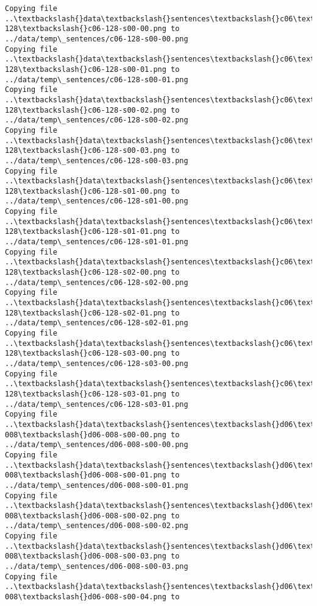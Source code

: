 \documentclass[11pt]{article}
\begin{document}
\begin{Verbatim}[commandchars=\\\{\}]
Copying file ..\textbackslash{}data\textbackslash{}sentences\textbackslash{}c06\textbackslash{}c06-128\textbackslash{}c06-128-s00-00.png to
../data/temp\_sentences/c06-128-s00-00.png
Copying file ..\textbackslash{}data\textbackslash{}sentences\textbackslash{}c06\textbackslash{}c06-128\textbackslash{}c06-128-s00-01.png to
../data/temp\_sentences/c06-128-s00-01.png
Copying file ..\textbackslash{}data\textbackslash{}sentences\textbackslash{}c06\textbackslash{}c06-128\textbackslash{}c06-128-s00-02.png to
../data/temp\_sentences/c06-128-s00-02.png
Copying file ..\textbackslash{}data\textbackslash{}sentences\textbackslash{}c06\textbackslash{}c06-128\textbackslash{}c06-128-s00-03.png to
../data/temp\_sentences/c06-128-s00-03.png
Copying file ..\textbackslash{}data\textbackslash{}sentences\textbackslash{}c06\textbackslash{}c06-128\textbackslash{}c06-128-s01-00.png to
../data/temp\_sentences/c06-128-s01-00.png
Copying file ..\textbackslash{}data\textbackslash{}sentences\textbackslash{}c06\textbackslash{}c06-128\textbackslash{}c06-128-s01-01.png to
../data/temp\_sentences/c06-128-s01-01.png
Copying file ..\textbackslash{}data\textbackslash{}sentences\textbackslash{}c06\textbackslash{}c06-128\textbackslash{}c06-128-s02-00.png to
../data/temp\_sentences/c06-128-s02-00.png
Copying file ..\textbackslash{}data\textbackslash{}sentences\textbackslash{}c06\textbackslash{}c06-128\textbackslash{}c06-128-s02-01.png to
../data/temp\_sentences/c06-128-s02-01.png
Copying file ..\textbackslash{}data\textbackslash{}sentences\textbackslash{}c06\textbackslash{}c06-128\textbackslash{}c06-128-s03-00.png to
../data/temp\_sentences/c06-128-s03-00.png
Copying file ..\textbackslash{}data\textbackslash{}sentences\textbackslash{}c06\textbackslash{}c06-128\textbackslash{}c06-128-s03-01.png to
../data/temp\_sentences/c06-128-s03-01.png
Copying file ..\textbackslash{}data\textbackslash{}sentences\textbackslash{}d06\textbackslash{}d06-008\textbackslash{}d06-008-s00-00.png to
../data/temp\_sentences/d06-008-s00-00.png
Copying file ..\textbackslash{}data\textbackslash{}sentences\textbackslash{}d06\textbackslash{}d06-008\textbackslash{}d06-008-s00-01.png to
../data/temp\_sentences/d06-008-s00-01.png
Copying file ..\textbackslash{}data\textbackslash{}sentences\textbackslash{}d06\textbackslash{}d06-008\textbackslash{}d06-008-s00-02.png to
../data/temp\_sentences/d06-008-s00-02.png
Copying file ..\textbackslash{}data\textbackslash{}sentences\textbackslash{}d06\textbackslash{}d06-008\textbackslash{}d06-008-s00-03.png to
../data/temp\_sentences/d06-008-s00-03.png
Copying file ..\textbackslash{}data\textbackslash{}sentences\textbackslash{}d06\textbackslash{}d06-008\textbackslash{}d06-008-s00-04.png to

\end{Verbatim}
\end{document}
